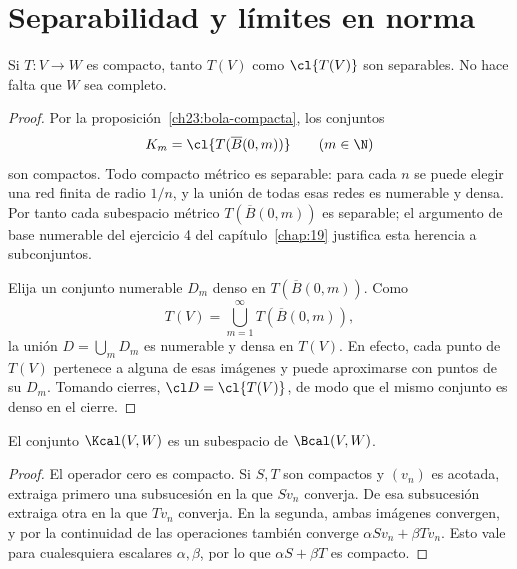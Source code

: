 \section{Separabilidad y límites en norma}

\begin{teorema}\label{ch23:separable}
Si $T:V\to W$ es compacto, tanto $T(V)$ como $\cl{T(V)}$ son separables. No hace falta que $W$ sea completo.
\end{teorema}
\begin{proof}
Por la proposición~\ref{ch23:bola-compacta}, los conjuntos
\[
 K_m=\cl{T(\overline B(0,m))}\qquad(m\in\N)
\]
son compactos. Todo compacto métrico es separable: para cada $n$ se puede elegir una red finita de radio $1/n$, y la unión de todas esas redes es numerable y densa. Por tanto cada subespacio métrico $T(\overline B(0,m))$ es separable; el argumento de base numerable del ejercicio 4 del capítulo~\ref{chap:19} justifica esta herencia a subconjuntos.

Elija un conjunto numerable $D_m$ denso en $T(\overline B(0,m))$. Como
\[
 T(V)=\bigcup_{m=1}^{\infty}T(\overline B(0,m)),
\]
la unión $D=\bigcup_mD_m$ es numerable y densa en $T(V)$. En efecto, cada punto de $T(V)$ pertenece a alguna de esas imágenes y puede aproximarse con puntos de su $D_m$. Tomando cierres, $\cl D=\cl{T(V)}$, de modo que el mismo conjunto es denso en el cierre.
\end{proof}

\begin{proposicion}
El conjunto $\Kcal(V,W)$ es un subespacio de $\Bcal(V,W)$.
\end{proposicion}
\begin{proof}
El operador cero es compacto. Si $S,T$ son compactos y $(v_n)$ es acotada, extraiga primero una subsucesión en la que $Sv_n$ converja. De esa subsucesión extraiga otra en la que $Tv_n$ converja. En la segunda, ambas imágenes convergen, y por la continuidad de las operaciones también converge $\alpha Sv_n+\beta Tv_n$. Esto vale para cualesquiera escalares $\alpha,\beta$, por lo que $\alpha S+\beta T$ es compacto.
\end{proof}

